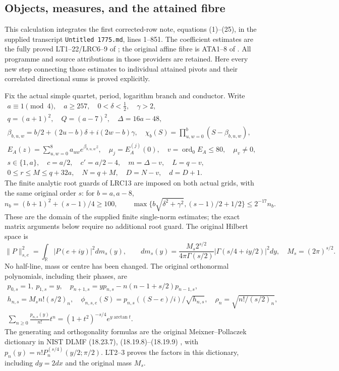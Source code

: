 \documentclass[11pt,a4paper]{article}
\begin{document}
\subsection{Objects, measures, and the attained fibre}
This calculation integrates the first corrected-row note, equations
(1)--(25), in the supplied transcript \texttt{Untitled 1775.md}, lines
1--851. The coefficient estimates are the fully proved LT1--22/LRC6--9
of ; the original affine fibre is
ATA1--8 of .
All programme and source attributions in those providers are retained.
Here every new step connecting those estimates to individual attained
pivots and their correlated directional sums is proved explicitly.

Fix the actual simple quartet, period, logarithm branch and conductor.
Write
\[
\begin{gathered}
a\equiv1\pmod4,\quad a\ge257,\quad 0<\delta<\tfrac12,\quad\gamma>2,\\
q=(a+1)^2,\quad Q=(a-7)^2,\quad\Delta=16a-48,\\
\beta_{b,u,w}=b/2+(2u-b)\delta+i(2w-b)\gamma,
\quad\chi_b(S)=\prod_{u,w=0}^{b}(S-\beta_{b,u,w}),\\
E_A(z)=\sum_{u,w=0}^{8}a_{uw}e^{\beta_{8,u,w}z},\quad
\mu_j=E_A^{(j)}(0),\quad v=\operatorname{ord}_0 E_A\le80,
\quad\mu_v\ne0,\\
s\in\{1,a\},\quad c=a/2,\quad c'=a/2-4,\quad
m=\Delta-v,\quad L=q-v,\\
0\le r\le M\le q+32a,\quad N=q+M,\quad D=N-v,\quad d=D+1.
\end{gathered}\tag{CRP1}
\]
The finite analytic root guards of LRC13 are imposed on both actual
grids, with the same original order $s$: for $b=a,a-8$,
\[
n_b=(b+1)^2+(s-1)/4\ge100,\qquad
\max\{b\sqrt{\delta^2+\gamma^2},(s-1)/2+1/2\}\le2^{-17}n_b.
\tag{CRP2}
\]
These are the domain of the supplied finite single-norm estimates;
the exact matrix arguments below require no additional root guard.
The original Hilbert space is
\[
\|P\|_{s,e}^2=\int_{\mathbb R}|P(e+iy)|^2dm_s(y),\qquad
dm_s(y)=\frac{M_s2^{s/2}}{4\pi\Gamma(s/2)}
 |\Gamma(s/4+iy/2)|^2dy,\quad M_s=(2\pi)^{s/2}.\tag{CRP3}
\]
No half-line, mass or centre has been changed. The original orthonormal
polynomials, including their phases, are
\[
\begin{gathered}
p_{0,s}=1,\ p_{1,s}=y,\quad
p_{n+1,s}=yp_{n,s}-n(n-1+s/2)p_{n-1,s},\\
h_{n,s}=M_sn!(s/2)_n,\quad
\phi_{n,s,e}(S)=p_{n,s}((S-e)/i)/\sqrt{h_{n,s}},\quad
\rho_n=\sqrt{n!/(s/2)_n},\\
\sum_{n\ge0}\frac{p_{n,s}(y)}{n!}t^n
 =(1+t^2)^{-s/4}e^{y\arctan t}.\tag{CRP4}
\end{gathered}
\]
The generating and orthogonality formulas are the original
Meixner--Pollaczek dictionary in NIST DLMF (18.23.7), (18.19.8)--(18.19.9)
\cite{human:dlmf18}, with $p_n(y)=n!P_n^{(s/4)}(y/2;\pi/2)$.
LT2--3 proves the factors in this dictionary, including $dy=2dx$ and
the original mass $M_s$.
\end{document}
